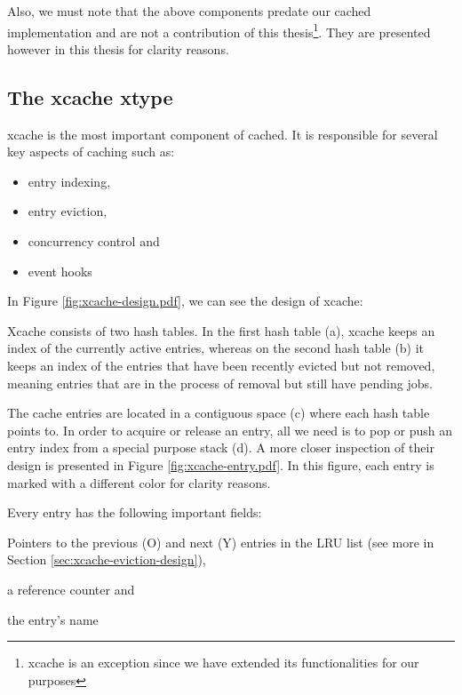 Also, we must note that the above components predate our cached implementation 
and are not a contribution of this thesis\footnote{xcache is an exception since 
	we have extended its functionalities for our purposes}. They are 
presented however in this thesis for clarity reasons. 

\subsection{The xcache xtype}\label{sec:xcache-design}

xcache is the most important component of cached. It is responsible for several 
key aspects of caching such as:

\begin{itemize}
	\item entry indexing,
	\item entry eviction,
	\item concurrency control and
	\item event hooks
\end{itemize}

In Figure \ref{fig:xcache-design.pdf}, we can see the design of xcache:


Xcache consists of two hash tables. In the first hash table (a), xcache keeps 
an index of the currently active entries, whereas on the second hash table (b) 
it keeps an index of the entries that have been recently evicted but not 
removed, meaning entries that are in the process of removal but still have 
pending jobs.

The cache entries are located in a contiguous space (c) where each hash table 
points to. In order to acquire or release an entry, all we need is to pop or 
push an entry index from a special purpose stack (d). A more closer inspection 
of their design is presented in Figure \ref{fig:xcache-entry.pdf}. In this 
figure, each entry is marked with a different color for clarity reasons.


Every entry has the following important fields:
\begin{inparaenum}[i.]
	\item Pointers to the previous (O) and next (Y) entries in the LRU list 
		(see more in Section \ref{sec:xcache-eviction-design}),
	\item a reference counter and
	\item the entry's name
\end{inparaenum}

